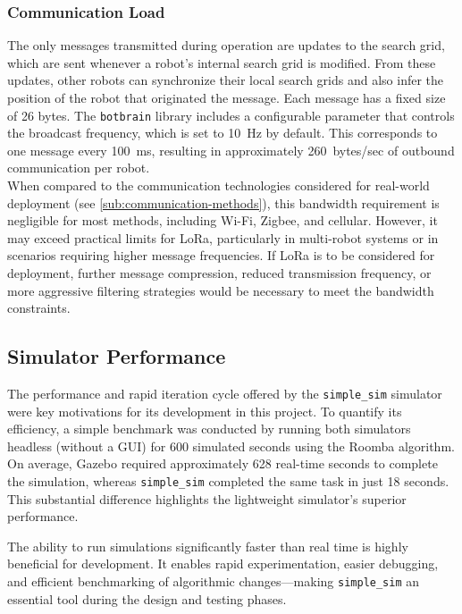 \subsubsection{Communication Load}
The only messages transmitted during operation are updates to the search grid, which are sent whenever a robot’s internal search grid is modified. From these updates, other robots can synchronize their local search grids and also infer the position of the robot that originated the message. Each message has a fixed size of 26 bytes. The \texttt{botbrain} library includes a configurable parameter that controls the broadcast frequency, which is set to \SI{10}{Hz} by default. This corresponds to one message every \SI{100}{ms}, resulting in approximately \SI{260}{bytes/sec} of outbound communication per robot. \\

When compared to the communication technologies considered for real-world deployment (see \cref{sub:communication-methods}), this bandwidth requirement is negligible for most methods, including Wi-Fi, Zigbee, and cellular. However, it may exceed practical limits for LoRa, particularly in multi-robot systems or in scenarios requiring higher message frequencies. If LoRa is to be considered for deployment, further message compression, reduced transmission frequency, or more aggressive filtering strategies would be necessary to meet the bandwidth constraints.

\subsection{Simulator Performance}
\label{sec:simulator-performance}
The performance and rapid iteration cycle offered by the \texttt{simple\_sim} simulator were key motivations for its development in this project. To quantify its efficiency, a simple benchmark was conducted by running both simulators headless (without a GUI) for 600 simulated seconds using the Roomba algorithm. On average, Gazebo required approximately 628 real-time seconds to complete the simulation, whereas \texttt{simple\_sim} completed the same task in just 18 seconds. This substantial difference highlights the lightweight simulator’s superior performance.

The ability to run simulations significantly faster than real time is highly beneficial for development. It enables rapid experimentation, easier debugging, and efficient benchmarking of algorithmic changes—making \texttt{simple\_sim} an essential tool during the design and testing phases.
